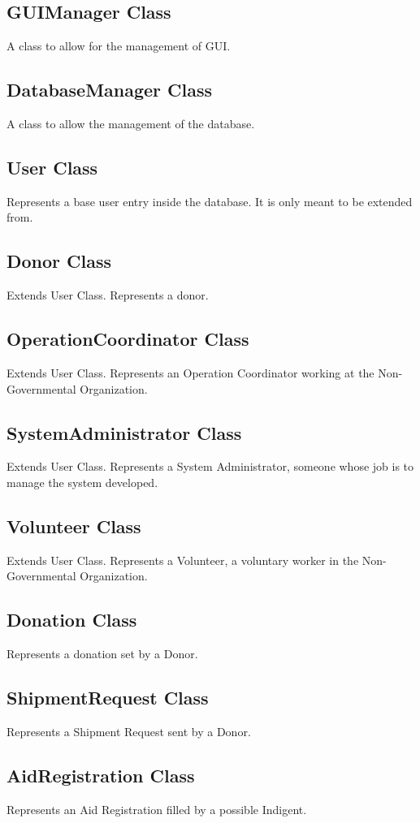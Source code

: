 \documentclass[a4paper,12pt]{report}
\begin{document}
		\subsection{GUIManager Class}
			A class to allow for the management of GUI.
		\subsection{DatabaseManager Class}
			A class to allow the management of the database.
		\subsection{User Class}
			Represents a base user entry inside the database. It is only meant to be extended from.
		\subsection{Donor Class}
			Extends User Class. Represents a donor.
		\subsection{OperationCoordinator Class}
			Extends User Class. Represents an Operation Coordinator working at the Non-Governmental Organization.
		\subsection{SystemAdministrator Class}
			Extends User Class. Represents a System Administrator, someone whose job is to manage the system developed.
		\subsection{Volunteer Class}
			Extends User Class. Represents a Volunteer, a voluntary worker in the Non-Governmental Organization.
		\subsection{Donation Class}
			Represents a donation set by a Donor.
		\subsection{ShipmentRequest Class}
			Represents a Shipment Request sent by a Donor.
		\subsection{AidRegistration Class}
			Represents an Aid Registration filled by a possible Indigent.
\end{document}
